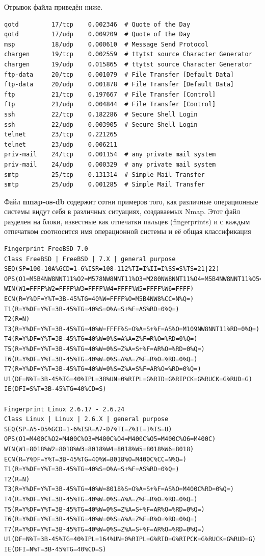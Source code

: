 \documentclass[a4paper, 12pt]{article}		%
\begin{document}
Отрывок файла приведён ниже.

\begin{Verbatim}[frame=single]
qotd         17/tcp    0.002346  # Quote of the Day
qotd         17/udp    0.009209  # Quote of the Day
msp          18/udp    0.000610  # Message Send Protocol
chargen      19/tcp    0.002559  # ttytst source Character Generator
chargen      19/udp    0.015865  # ttytst source Character Generator
ftp-data     20/tcp    0.001079  # File Transfer [Default Data]
ftp-data     20/udp    0.001878  # File Transfer [Default Data]
ftp          21/tcp    0.197667  # File Transfer [Control]
ftp          21/udp    0.004844  # File Transfer [Control]
ssh          22/tcp    0.182286  # Secure Shell Login
ssh          22/udp    0.003905  # Secure Shell Login
telnet       23/tcp    0.221265
telnet       23/udp    0.006211
priv-mail    24/tcp    0.001154  # any private mail system
priv-mail    24/udp    0.000329  # any private mail system
smtp         25/tcp    0.131314  # Simple Mail Transfer
smtp         25/udp    0.001285  # Simple Mail Transfer
\end{Verbatim}

Файл \textbf{nmap-os-db} содержит сотни примеров того, как различные операционные системы видут себя в различных ситуациях, создаваемых Nmap. Этот файл разделен на блоки, известные как отпечатки пальцев (fingerprints) и с каждым отпечатком соотносится имя операционной системы и её общая классификация

\begin{Verbatim}[frame=single]
Fingerprint FreeBSD 7.0
Class FreeBSD | FreeBSD | 7.X | general purpose
SEQ(SP=100-10A%GCD=1-6%ISR=108-112%TI=I%II=I%SS=S%TS=21|22)
OPS(O1=M5B4NW8NNT11%O2=M578NW8NNT11%O3=M280NW8NNT11%O4=M5B4NW8NNT11%O5=M218NW8NNT11%O6=M109NNT11)
WIN(W1=FFFF%W2=FFFF%W3=FFFF%W4=FFFF%W5=FFFF%W6=FFFF)
ECN(R=Y%DF=Y%T=3B-45%TG=40%W=FFFF%O=M5B4NW8%CC=N%Q=)
T1(R=Y%DF=Y%T=3B-45%TG=40%S=O%A=S+%F=AS%RD=0%Q=)
T2(R=N)
T3(R=Y%DF=Y%T=3B-45%TG=40%W=FFFF%S=O%A=S+%F=AS%O=M109NW8NNT11%RD=0%Q=)
T4(R=Y%DF=Y%T=3B-45%TG=40%W=0%S=A%A=Z%F=R%O=%RD=0%Q=)
T5(R=Y%DF=Y%T=3B-45%TG=40%W=0%S=Z%A=S+%F=AR%O=%RD=0%Q=)
T6(R=Y%DF=Y%T=3B-45%TG=40%W=0%S=A%A=Z%F=R%O=%RD=0%Q=)
T7(R=Y%DF=Y%T=3B-45%TG=40%W=0%S=Z%A=S%F=AR%O=%RD=0%Q=)
U1(DF=N%T=3B-45%TG=40%IPL=38%UN=0%RIPL=G%RID=G%RIPCK=G%RUCK=G%RUD=G)
IE(DFI=S%T=3B-45%TG=40%CD=S)

Fingerprint Linux 2.6.17 - 2.6.24
Class Linux | Linux | 2.6.X | general purpose
SEQ(SP=A5-D5%GCD=1-6%ISR=A7-D7%TI=Z%II=I%TS=U)
OPS(O1=M400C%O2=M400C%O3=M400C%O4=M400C%O5=M400C%O6=M400C)
WIN(W1=8018%W2=8018%W3=8018%W4=8018%W5=8018%W6=8018)
ECN(R=Y%DF=Y%T=3B-45%TG=40%W=8018%O=M400C%CC=N%Q=)
T1(R=Y%DF=Y%T=3B-45%TG=40%S=O%A=S+%F=AS%RD=0%Q=)
T2(R=N)
T3(R=Y%DF=Y%T=3B-45%TG=40%W=8018%S=O%A=S+%F=AS%O=M400C%RD=0%Q=)
T4(R=Y%DF=Y%T=3B-45%TG=40%W=0%S=A%A=Z%F=R%O=%RD=0%Q=)
T5(R=Y%DF=Y%T=3B-45%TG=40%W=0%S=Z%A=S+%F=AR%O=%RD=0%Q=)
T6(R=Y%DF=Y%T=3B-45%TG=40%W=0%S=A%A=Z%F=R%O=%RD=0%Q=)
T7(R=Y%DF=Y%T=3B-45%TG=40%W=0%S=Z%A=S+%F=AR%O=%RD=0%Q=)
U1(DF=N%T=3B-45%TG=40%IPL=164%UN=0%RIPL=G%RID=G%RIPCK=G%RUCK=G%RUD=G)
IE(DFI=N%T=3B-45%TG=40%CD=S)
\end{Verbatim}
\end{document}
